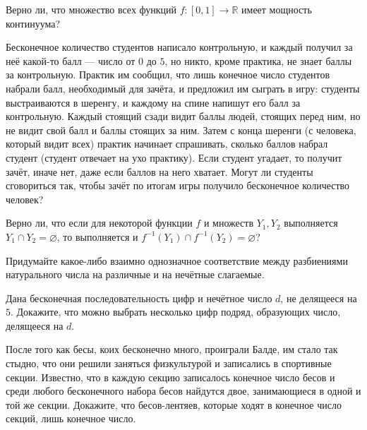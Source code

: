

\ifPDFTeX
  \renewcommand{\rmdefault}{cmr}
\fi

\def\SheetNo{3}
\setlength{\emergencystretch}{2em}



\begin{problems}

\item Верно ли, что множество всех функций $f\colon[0,1]\to\mathbb R$ имеет мощность континуума?

\item Бесконечное количество студентов написало контрольную, и каждый получил за неё какой-то балл --- число от $0$ до $5$, но никто, кроме практика, не знает баллы за контрольную. Практик им сообщил, что лишь конечное число студентов набрали балл, необходимый для зачёта, и предложил им сыграть в игру: студенты выстраиваются в шеренгу, и каждому на спине напишут его балл за контрольную. Каждый стоящий сзади видит баллы людей, стоящих перед ним, но не видит свой балл и баллы стоящих за ним. Затем с конца шеренги (с человека, который видит всех) практик начинает спрашивать, сколько баллов набрал студент (студент отвечает на ухо практику). Если студент угадает, то получит зачёт, иначе нет, даже если баллов на него хватает. Могут ли студенты сговориться так, чтобы зачёт по итогам игры получило бесконечное количество человек?

\item Верно ли, что если для некоторой функции $f$ и множеств $Y_1,Y_2$ выполняется $Y_1\cap Y_2=\varnothing$, то выполняется и $f^{-1}(Y_1)\cap f^{-1}(Y_2)=\varnothing$?

\item Придумайте какое-либо взаимно однозначное соответствие между разбиениями натурального числа на различные и на нечётные слагаемые.

\item Дана бесконечная последовательность цифр и нечётное число $d$, не делящееся на $5$. Докажите, что можно выбрать несколько цифр подряд, образующих число, делящееся на $d$.

\item После того как бесы, коих бесконечно много, проиграли Балде, им стало так стыдно, что они решили заняться физкультурой и записались в спортивные секции. Известно, что в каждую секцию записалось конечное число бесов и среди любого бесконечного набора бесов найдутся двое, занимающиеся в одной и той же секции. Докажите, что бесов-лентяев, которые ходят в конечное число секций, лишь конечное число.


\end{problems}
